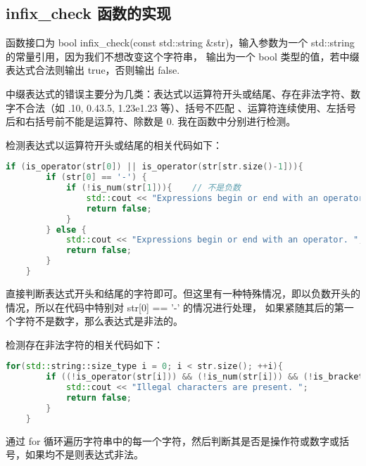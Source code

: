 \documentclass[UTF8]{ctexart}
\begin{document}
\subsection{infix\_check 函数的实现}
函数接口为 bool infix\_check(const std::string \&str)，输入参数为一个 std::string 的常量引用，因为我们不想改变这个字符串，
输出为一个 bool 类型的值，若中缀表达式合法则输出 true，否则输出 false. 

中缀表达式的错误主要分为几类：表达式以运算符开头或结尾、存在非法字符、数字不合法（如 .10, 0.43.5, 1.23e1.23 等）、括号不匹配
、运算符连续使用、左括号后和右括号前不能是运算符、除数是 0. 我在函数中分别进行检测。

检测表达式以运算符开头或结尾的相关代码如下：
\begin{lstlisting}[language=c++, breaklines=true, keywordstyle=\color{blue!70}, commentstyle=\color{red!50!green!50!blue!50}, frame=shadowbox, rulesepcolor=\color{red!20!green!20!blue!20}]
    if (is_operator(str[0]) || is_operator(str[str.size()-1])){
        if (str[0] == '-') {
            if (!is_num(str[1])){    // 不是负数
                std::cout << "Expressions begin or end with an operator. "; 
                return false; 
            }
        } else {
            std::cout << "Expressions begin or end with an operator. "; 
            return false; 
        }
    }
\end{lstlisting}
直接判断表达式开头和结尾的字符即可。但这里有一种特殊情况，即以负数开头的情况，所以在代码中特别对 str[0] == '-' 的情况进行处理，
如果紧随其后的第一个字符不是数字，那么表达式是非法的。

检测存在非法字符的相关代码如下：
\begin{lstlisting}[language=c++, breaklines=true, keywordstyle=\color{blue!70}, commentstyle=\color{red!50!green!50!blue!50}, frame=shadowbox, rulesepcolor=\color{red!20!green!20!blue!20}]
    for(std::string::size_type i = 0; i < str.size(); ++i){
        if ((!is_operator(str[i])) && (!is_num(str[i])) && (!is_bracket(str[i]))){
            std::cout << "Illegal characters are present. "; 
            return false; 
        }
    }
\end{lstlisting}
通过 for 循环遍历字符串中的每一个字符，然后判断其是否是操作符或数字或括号，如果均不是则表达式非法。
\end{document}

